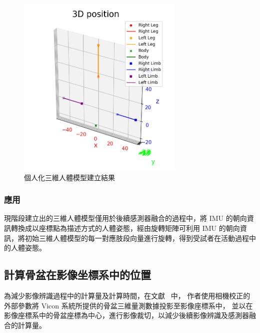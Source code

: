 
\begin{figure}[!ht]
   \centering
   \includegraphics[width=8cm]{figure/ch3_fig_my_skeleton.png}
   \caption[個人化三維人體模型建立結果]{個人化三維人體模型建立結果}
   \label{ch3_fig_my_skeleton}
\end{figure}

\subsubsection{應用}
現階段建立出的三維人體模型僅用於後續感測器融合的過程中，將 IMU 的朝向資訊轉換成以座標點為描述方式的人體姿態，經由旋轉矩陣可利用 IMU 的朝向資訊，將初始三維人體模型的每一對應肢段向量進行旋轉，得到受試者在活動過程中的人體姿態。

\subsection{計算骨盆在影像坐標系中的位置}
為減少影像辨識過程中的計算量及計算時間，在文獻~\cite{Zhang_2020_CVPR} 中，
作者使用相機校正的外部參數將 Vicon 系統所提供的骨盆三維量測數據投影至影像座標系中，
並以在影像座標系中的骨盆座標為中心，進行影像裁切，以減少後續影像辨識及感測器融合的計算量。

